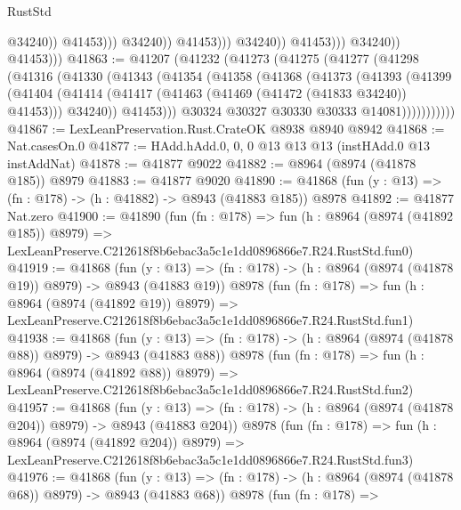 \begin{lexlean}{RustStd}
\begin{coremodule}
                                            @34240))
                                        @41453)))
                                  @34240))
                              @41453)))
                        @34240))
                    @41453)))
              @34240))
          @41453)))
@41863 := @41207
    (@41232
      (@41273
        (@41275
          (@41277
            (@41298
              (@41316
                (@41330
                  (@41343
                    (@41354
                      (@41358
                        (@41368
                          (@41373
                            (@41393
                              (@41399
                                (@41404
                                  (@41414
                                    (@41417 (@41463 (@41469 (@41472 (@41833 @34240)) @41453)))
                                    @34240))
                                @41453)))
                          @30324
                          @30327
                          @30330
                          @30333
                          @14081)))))))))))
@41867 := LexLeanPreservation.Rust.CrateOK @8938 @8940 @8942
@41868 := Nat.casesOn.{0}
@41877 := HAdd.hAdd.{0, 0, 0} @13 @13 @13 (instHAdd.{0} @13 instAddNat)
@41878 := @41877 @9022
@41882 := @8964 (@8974 (@41878 @185)) @8979
@41883 := @41877 @9020
@41890 := @41868 (fun (y : @13) => (fn : @178) -> (h : @41882) -> @8943 (@41883 @185)) @8978
@41892 := @41877 Nat.zero
@41900 := @41890
    (fun (fn : @178) =>
    fun (h : @8964 (@8974 (@41892 @185)) @8979) =>
    LexLeanPreserve.C212618f8b6ebac3a5c1e1dd0896866e7.R24.RustStd.fun0)
@41919 := @41868
    (fun (y : @13) => (fn : @178) -> (h : @8964 (@8974 (@41878 @19)) @8979) -> @8943 (@41883 @19))
    @8978
    (fun (fn : @178) =>
    fun (h : @8964 (@8974 (@41892 @19)) @8979) =>
    LexLeanPreserve.C212618f8b6ebac3a5c1e1dd0896866e7.R24.RustStd.fun1)
@41938 := @41868
    (fun (y : @13) => (fn : @178) -> (h : @8964 (@8974 (@41878 @88)) @8979) -> @8943 (@41883 @88))
    @8978
    (fun (fn : @178) =>
    fun (h : @8964 (@8974 (@41892 @88)) @8979) =>
    LexLeanPreserve.C212618f8b6ebac3a5c1e1dd0896866e7.R24.RustStd.fun2)
@41957 := @41868
    (fun (y : @13) => (fn : @178) -> (h : @8964 (@8974 (@41878 @204)) @8979) -> @8943 (@41883 @204))
    @8978
    (fun (fn : @178) =>
    fun (h : @8964 (@8974 (@41892 @204)) @8979) =>
    LexLeanPreserve.C212618f8b6ebac3a5c1e1dd0896866e7.R24.RustStd.fun3)
@41976 := @41868
    (fun (y : @13) => (fn : @178) -> (h : @8964 (@8974 (@41878 @68)) @8979) -> @8943 (@41883 @68))
    @8978
    (fun (fn : @178) =>

\end{coremodule}
\end{lexlean}
